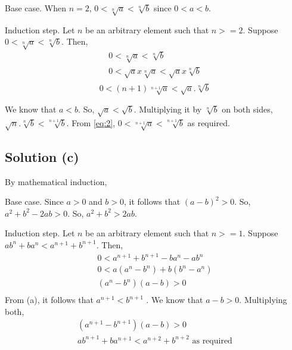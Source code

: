 \documentclass{article}
\begin{document}
Base case. When $n = 2$, $0 < \sqrt[n]{a} < \sqrt[n]{b}$ since $0 < a
< b$.

Induction step. Let $n$ be an arbitrary element such that $n >= 2$.
Suppose $0 < \sqrt[n]{a} < \sqrt[n]{b}$. Then,
\begin{align*}
  0 < \sqrt[n]{a} < \sqrt[n]{b} \\
  0 < \sqrt{a} x \sqrt[n]{a} < \sqrt{a} x \sqrt[n]{b} \\
\end{align*}
\begin{equation} \label{eq:2}
    0 < (n+1)\sqrt[n+1]{a} < \sqrt{a}.\sqrt[n]{b}
\end{equation}

We know that $a < b$. So, $\sqrt{a} < \sqrt{b}$. Multiplying it by
$\sqrt[n]{b}$ on both sides, $\sqrt{n}. \sqrt[n]{b} < \sqrt[n+1]{b}$.
From \ref{eq:2}, $0 < \sqrt[n+1]{a} < \sqrt[n+1]{b}$ as required.

\subsection{Solution (c)}
By mathematical induction,

Base case. Since $a > 0$ and $b>0$, it follows that $(a-b)^2 > 0$. So,
$a^2 + b^2 - 2ab > 0$. So, $a^2 + b^2 > 2ab$.

Induction step. Let $n$ be an arbitrary element such that $n >= 1$.
Suppose $ab^n + ba^n < a^{n+1} + b^{n+1}$. Then,
\begin{align*}
  0 < a^{n+1} + b^{n+1} - ba^n - ab^n \\
  0 < a(a^n - b^n) + b(b^n - a^n) \\
  (a^n - b^n)(a - b) > 0 \\
\end{align*}
From (a), it follows that $a^{n+1} < b^{n+1}$ . We know that $a - b >
0$. Multiplying both,
\begin{align*}
  (a^{n+1} - b^{n+1})(a-b) > 0 \\
  ab^{n+1} + ba^{n+1} < a^{n+2} + b^{n+2}  \text{  as required}
\end{align*}
\end{document}
